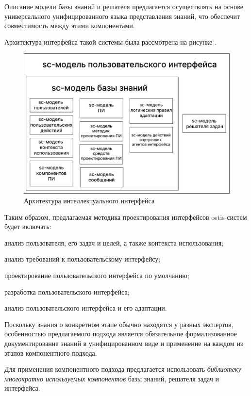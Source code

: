 Описание модели базы знаний и решателя предлагается осуществлять на основе универсального унифицированного языка представления знаний, что обеспечит совместимость между этими компонентами.

Архитектура интерфейса такой системы была рассмотрена на рисунке .

\begin{figure}[h]
	\centering
	\includegraphics[scale=0.15]{images/part5/sc-model-ui.png}
	\caption{Архитектура интеллектуального интерфейса}
	\label{fig:archit_intel_system}
\end{figure}

Таким образом, предлагаемая методика проектирования интерфейсов ostis-систем будет включать:
\begin{textitemize}
\item анализ пользователя, его задач и целей, а также контекста использования;
\item анализ требований к пользовательскому интерфейсу;
\item проектирование пользовательского интерфейса по умолчанию;
\item разработка пользовательского интерфейса;
\item анализ пользовательского интерфейса и его адаптации.
\end{textitemize}

Поскольку знания о конкретном этапе обычно находятся у разных экспертов, особенностью предлагаемого подхода является обязательное формализованное документирование знаний в унифицированном виде и применение на каждом из этапов компонентного подхода.

Для применения компонентного подхода предлагается использовать \textit{библиотеку многократно используемых компонентов} базы знаний, решателя задач и интерфейса.


